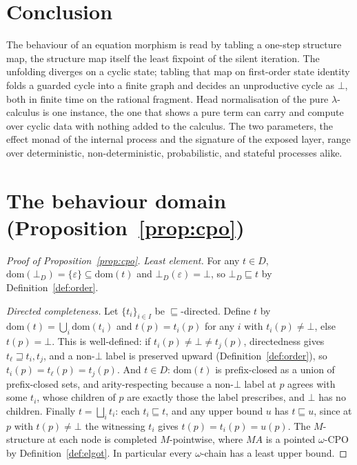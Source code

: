 \section{Conclusion}\label{sec:conclusion}
The behaviour of an equation morphism is read by tabling a one-step structure map, the structure map
itself the least fixpoint of the silent iteration. The unfolding diverges on a cyclic state; tabling
that map on first-order state identity folds a guarded cycle into a finite graph and decides an
unproductive cycle as $\bot$, both in finite time on the rational fragment. Head normalisation of
the pure $\lambda$-calculus is one instance, the one that shows a pure term can carry and compute over
cyclic data with nothing added to the calculus. The two parameters, the effect monad of the internal
process and the signature of the exposed layer, range over deterministic, non-deterministic,
probabilistic, and stateful processes alike.

\appendix
\section{The behaviour domain (Proposition~\ref{prop:cpo})}\label{app:domain}
\begin{proof}[Proof of Proposition~\ref{prop:cpo}]
  \emph{Least element.} For any $t \in D$, $\mathrm{dom}(\bot_D) = \{\varepsilon\} \subseteq
  \mathrm{dom}(t)$ and $\bot_D(\varepsilon) = \bot$, so $\bot_D \sqsubseteq t$ by
  Definition~\ref{def:order}.

  \emph{Directed completeness.} Let $\{t_i\}_{i\in I}$ be $\sqsubseteq$-directed. Define $t$ by
  $\mathrm{dom}(t) = \bigcup_i \mathrm{dom}(t_i)$ and $t(p) = t_i(p)$ for any $i$ with
  $t_i(p) \neq \bot$, else $t(p) = \bot$. This is well-defined: if $t_i(p) \neq \bot \neq t_j(p)$,
  directedness gives $t_\ell \sqsupseteq t_i, t_j$, and a non-$\bot$ label is preserved upward
  (Definition~\ref{def:order}), so $t_i(p) = t_\ell(p) = t_j(p)$. And $t \in D$: $\mathrm{dom}(t)$ is
  prefix-closed as a union of prefix-closed sets, and arity-respecting because a non-$\bot$ label at $p$
  agrees with some $t_i$, whose children of $p$ are exactly those the label prescribes, and $\bot$ has
  no children. Finally $t = \bigsqcup_i t_i$: each $t_i \sqsubseteq t$, and any upper bound $u$ has
  $t \sqsubseteq u$, since at $p$ with $t(p) \neq \bot$ the witnessing $t_i$ gives
  $t(p) = t_i(p) = u(p)$. The $M$-structure at each node is completed $M$-pointwise, where $M A$ is a
  pointed $\omega$-CPO by Definition~\ref{def:elgot}. In particular every $\omega$-chain has a least
  upper bound.
\end{proof}

